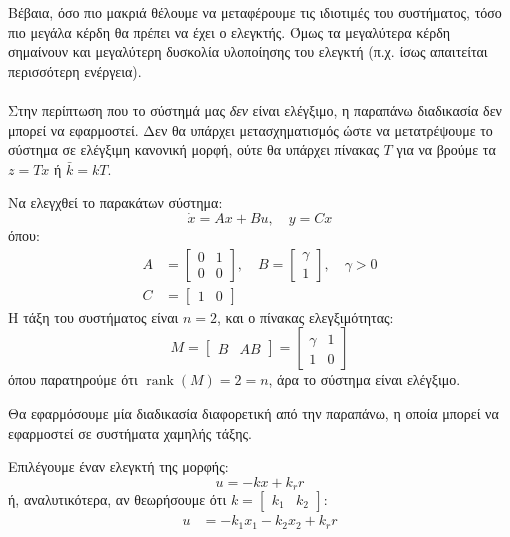 \documentclass[11pt,a4paper,notitlepage,fleqn]{article}
\begin{document}
Βέβαια, όσο πιο μακριά θέλουμε να μεταφέρουμε τις ιδιοτιμές του συστήματος,
τόσο πιο μεγάλα κέρδη θα πρέπει να έχει ο ελεγκτής. Όμως τα μεγαλύτερα
κέρδη σημαίνουν και μεγαλύτερη δυσκολία υλοποίησης του ελεγκτή (π.χ. ίσως
απαιτείται περισσότερη ενέργεια).

\paragraph{}
Στην περίπτωση που το σύστημά μας \textit{δεν} είναι ελέγξιμο, η
παραπάνω διαδικασία δεν μπορεί να εφαρμοστεί. Δεν θα υπάρχει μετασχηματισμός
ώστε να μετατρέψουμε το σύστημα σε ελέγξιμη κανονική μορφή, ούτε θα
υπάρχει πίνακας \( T \) για να βρούμε τα \( z=Tx \) ή \( \bar k = kT \).


\begin{exercise}{}
	Να ελεγχθεί το παρακάτων σύστημα:
	\[
	\dot x = Ax+Bu,\quad y=Cx
	\]
	όπου:
	\begin{align*}
		A &= \left[\begin{matrix}
		0 & 1 \\ 0 & 0
		\end{matrix}\right],\quad B = \left[\begin{matrix}
		\gamma \\ 1
		\end{matrix}\right],\quad \gamma >0\\
		C &= \left[\begin{matrix}
		1 & 0
		\end{matrix}\right]
	\end{align*}
	\tcblower
	Η τάξη του συστήματος είναι \( n=2 \), και ο πίνακας ελεγξιμότητας:
	\[
	M = \left[\begin{matrix}
	B & AB
	\end{matrix}\right] = \left[\begin{matrix}
	γ & 1 \\ 1 & 0
	\end{matrix}\right]
	\]
	όπου παρατηρούμε ότι \( \mathop{rank}(M) = 2 = n \), άρα το σύστημα είναι
	ελέγξιμο.
	
	Θα εφαρμόσουμε μία διαδικασία διαφορετική από την παραπάνω, η οποία
	μπορεί να εφαρμοστεί σε συστήματα χαμηλής τάξης.
	
	Επιλέγουμε έναν ελεγκτή της μορφής:
	\[
	u = -kx + k_r r
	\]
	ή, αναλυτικότερα, αν θεωρήσουμε ότι \( k = \left[\begin{matrix}
	k_1 & k_2
	\end{matrix}\right] \):
	\begin{align*}
		u &= -k_1 x_1 - k_2 x_2 + k_r r
	\end{align*}
	

\end{exercise}
\end{document}
